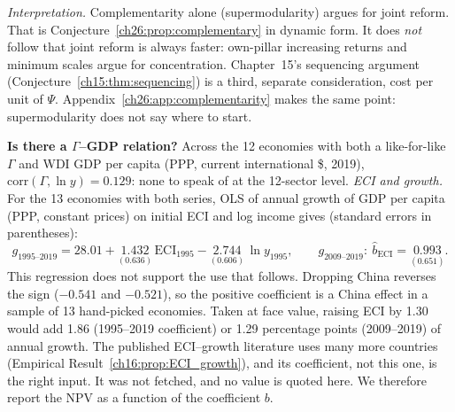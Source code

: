 \documentclass[../solutions_manual.tex]{subfiles}
\begin{document}
\emph{Interpretation.} Complementarity alone (supermodularity) argues for joint reform. That is Conjecture~\ref{ch26:prop:complementary} in dynamic form. It does \emph{not} follow that joint reform is always faster: own-pillar increasing returns and minimum scales argue for concentration. Chapter~15's sequencing argument (Conjecture~\ref{ch15:thm:sequencing}) is a third, separate consideration, cost per unit of $\Psi$. Appendix~\ref{ch26:app:complementarity} makes the same point: supermodularity does not say where to start.


 \textbf{Is there a $\Gamma$--GDP relation?} Across the 12 economies with both a like-for-like $\Gamma$ and WDI GDP per capita (PPP, current international \$, 2019), $\text{corr}(\Gamma, \ln y) = 0.129$: none to speak of at the 12-sector level. \emph{ECI and growth.} For the 13 economies with both series, OLS of annual growth of GDP per capita (PPP, constant prices) on initial ECI and log income gives (standard errors in parentheses):
\[
g_{1995\text{--}2019} = 28.01 + \underset{(0.636)}{1.432}\,\text{ECI}_{1995} - \underset{(0.606)}{2.744}\,\ln y_{1995},\qquad
g_{2009\text{--}2019}:\ \hat b_{\text{ECI}} = \underset{(0.651)}{0.993}.
\]
This regression does not support the use that follows. Dropping China reverses the sign ($-0.541$ and $-0.521$), so the positive coefficient is a China effect in a sample of 13 hand-picked economies. Taken at face value, raising ECI by 1.30 would add 1.86 (1995--2019 coefficient) or 1.29 percentage points (2009--2019) of annual growth. The published ECI--growth literature uses many more countries (Empirical Result~\ref{ch16:prop:ECI_growth}), and its coefficient, not this one, is the right input. It was not fetched, and no value is quoted here. We therefore report the NPV as a function of the coefficient $b$.
\end{document}
